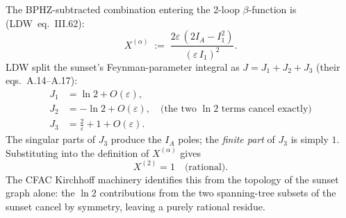 \documentclass[11pt,a4paper]{article}
\theoremstyle{plain}
\begin{document}
\begin{center}
\end{center}

The BPHZ-subtracted combination entering the 2-loop $\beta$-function is
(LDW~eq.~III.62):
\[
  X^{(\alpha)} \;:=\;
  \frac{2\varepsilon\,(2I_A - I_1^2)}{(\varepsilon\, I_1)^2}.
\]
LDW split the sunset's Feynman-parameter integral as
$J = J_1 + J_2 + J_3$ (their eqs.~A.14--A.17):
\begin{align*}
  J_1 &= \ln 2 + O(\varepsilon), \\
  J_2 &= -\ln 2 + O(\varepsilon), \quad \text{(the two $\ln 2$ terms cancel exactly)}\\
  J_3 &= \tfrac{2}{\varepsilon} + 1 + O(\varepsilon).
\end{align*}
The singular parts of $J_3$ produce the $I_A$ poles; the \emph{finite
part} of $J_3$ is simply $1$.  Substituting into the definition of
$X^{(\alpha)}$ gives
\[
  \boxed{X^{(2)} = 1 \quad \text{(rational)}.}
\]
The CFAC Kirchhoff machinery identifies this from the topology of the
sunset graph alone: the $\ln 2$ contributions from the two spanning-tree
subsets of the sunset cancel by symmetry, leaving a purely rational
residue.
\end{document}
